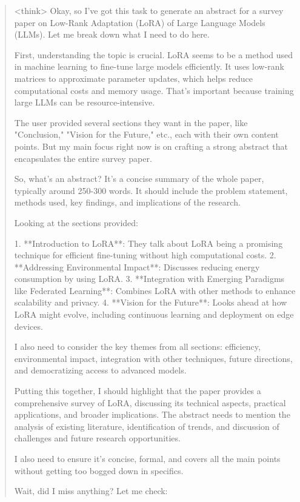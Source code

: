 \documentclass[conference]{IEEEtran}
\begin{document}
\begin{abstract}
<think>
Okay, so I've got this task to generate an abstract for a survey paper on Low-Rank Adaptation (LoRA) of Large Language Models (LLMs). Let me break down what I need to do here.

First, understanding the topic is crucial. LoRA seems to be a method used in machine learning to fine-tune large models efficiently. It uses low-rank matrices to approximate parameter updates, which helps reduce computational costs and memory usage. That's important because training large LLMs can be resource-intensive.

The user provided several sections they want in the paper, like "Conclusion," "Vision for the Future," etc., each with their own content points. But my main focus right now is on crafting a strong abstract that encapsulates the entire survey paper.

So, what's an abstract? It's a concise summary of the whole paper, typically around 250-300 words. It should include the problem statement, methods used, key findings, and implications of the research.

Looking at the sections provided:

1. **Introduction to LoRA**: They talk about LoRA being a promising technique for efficient fine-tuning without high computational costs.
2. **Addressing Environmental Impact**: Discusses reducing energy consumption by using LoRA.
3. **Integration with Emerging Paradigms like Federated Learning**: Combines LoRA with other methods to enhance scalability and privacy.
4. **Vision for the Future**: Looks ahead at how LoRA might evolve, including continuous learning and deployment on edge devices.

I also need to consider the key themes from all sections: efficiency, environmental impact, integration with other techniques, future directions, and democratizing access to advanced models.

Putting this together, I should highlight that the paper provides a comprehensive survey of LoRA, discussing its technical aspects, practical applications, and broader implications. The abstract needs to mention the analysis of existing literature, identification of trends, and discussion of challenges and future research opportunities.

I also need to ensure it's concise, formal, and covers all the main points without getting too bogged down in specifics.

Wait, did I miss anything? Let me check:


\end{abstract}
\end{document}
